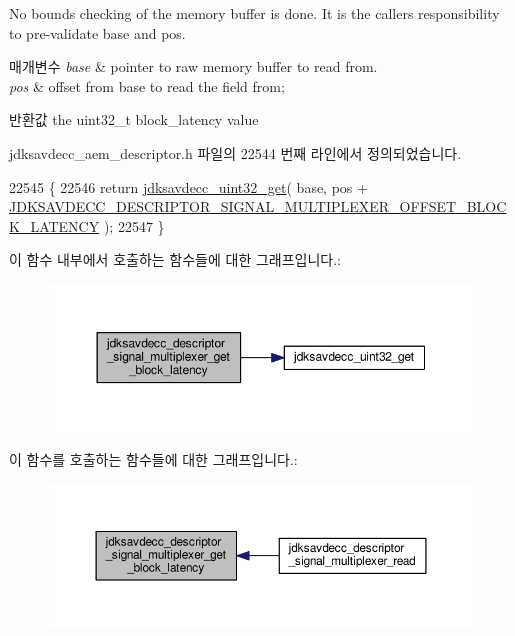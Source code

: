 No bounds checking of the memory buffer is done. It is the caller\textquotesingle{}s responsibility to pre-\/validate base and pos.


\begin{DoxyParams}{매개변수}
{\em base} & pointer to raw memory buffer to read from. \\
\hline
{\em pos} & offset from base to read the field from; \\
\hline
\end{DoxyParams}
\begin{DoxyReturn}{반환값}
the uint32\+\_\+t block\+\_\+latency value 
\end{DoxyReturn}


jdksavdecc\+\_\+aem\+\_\+descriptor.\+h 파일의 22544 번째 라인에서 정의되었습니다.


\begin{DoxyCode}
22545 \{
22546     \textcolor{keywordflow}{return} \hyperlink{group__endian_gaefcf5bd4f368997a82f358ab89052d6b}{jdksavdecc\_uint32\_get}( base, pos + 
      \hyperlink{group__descriptor__signal__multiplexer_ga8aee7715d5f15d5e5e642bde3d7c04f9}{JDKSAVDECC\_DESCRIPTOR\_SIGNAL\_MULTIPLEXER\_OFFSET\_BLOCK\_LATENCY}
       );
22547 \}
\end{DoxyCode}


이 함수 내부에서 호출하는 함수들에 대한 그래프입니다.\+:
\nopagebreak
\begin{figure}[H]
\begin{center}
\leavevmode
\includegraphics[width=350pt]{group__descriptor__signal__multiplexer_ga1d3e6b8e5534f24de8496594688fe571_cgraph}
\end{center}
\end{figure}




이 함수를 호출하는 함수들에 대한 그래프입니다.\+:
\nopagebreak
\begin{figure}[H]
\begin{center}
\leavevmode
\includegraphics[width=350pt]{group__descriptor__signal__multiplexer_ga1d3e6b8e5534f24de8496594688fe571_icgraph}
\end{center}
\end{figure}


